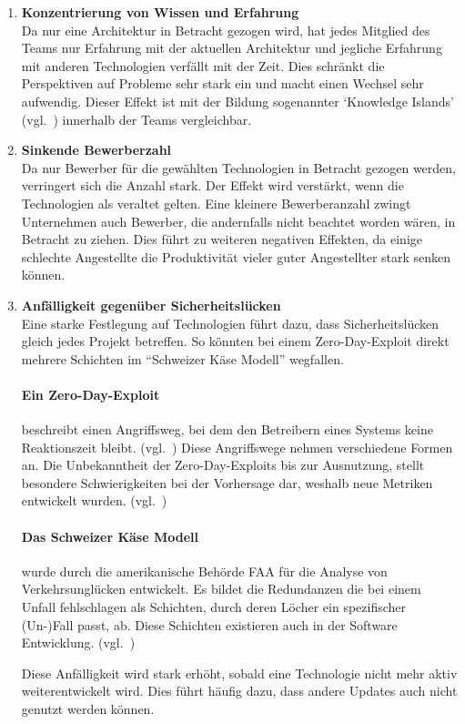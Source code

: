 \documentclass[./einleitung.tex]{subfiles}
\begin{document}
\begin{enumerate}
\item \textbf{Konzentrierung von Wissen und Erfahrung} \\
Da nur eine Architektur in Betracht gezogen wird, hat jedes Mitglied des Teams nur Erfahrung mit der aktuellen Architektur und jegliche Erfahrung mit anderen Technologien verfällt mit der Zeit.
Dies schränkt die Perspektiven auf Probleme sehr stark ein und macht einen Wechsel sehr aufwendig.
Dieser Effekt ist mit der Bildung sogenannter `Knowledge Islands' (vgl.~\cite{cury2024knowledge}) innerhalb der Teams vergleichbar.
\item \textbf{Sinkende Bewerberzahl} \\
Da nur Bewerber für die gewählten Technologien in Betracht gezogen werden, verringert sich die Anzahl stark.
Der Effekt wird verstärkt, wenn die Technologien als veraltet gelten.
Eine kleinere Bewerberanzahl zwingt Unternehmen auch Bewerber, die andernfalls nicht beachtet worden wären, in Betracht zu ziehen.
Dies führt zu weiteren negativen Effekten, da einige schlechte Angestellte die Produktivität vieler guter Angestellter stark senken können.
\item \textbf{Anfälligkeit gegenüber Sicherheitslücken} \\
Eine starke Festlegung auf Technologien führt dazu, dass Sicherheitslücken gleich jedes Projekt betreffen.
So könnten bei einem Zero-Day-Exploit direkt mehrere Schichten im ``Schweizer Käse Modell'' wegfallen.
\begin{center}
    \paragraph{Ein Zero-Day-Exploit} beschreibt einen Angriffsweg, bei dem den Betreibern eines Systems keine Reaktionszeit bleibt. (vgl.~\cite{ibmZeroDay})
    Diese Angriffswege nehmen verschiedene Formen an.
    Die Unbekanntheit der Zero-Day-Exploits bis zur Ausnutzung, stellt besondere Schwierigkeiten bei der Vorhersage dar, weshalb neue Metriken entwickelt wurden. (vgl.~\cite{wang2013k})
\end{center}
\begin{center}
    \paragraph{Das Schweizer Käse Modell} wurde durch die amerikanische Behörde FAA für die Analyse von Verkehrsunglücken entwickelt.
    Es bildet die Redundanzen die bei einem Unfall fehlschlagen als Schichten, durch deren Löcher ein spezifischer (Un-)Fall passt, ab.
    Diese Schichten existieren auch in der Software Entwicklung. (vgl.~\cite{bergeon2009swiss}) %
\end{center}
Diese Anfälligkeit wird stark erhöht, sobald eine Technologie nicht mehr aktiv weiterentwickelt wird.
Dies führt häufig dazu, dass andere Updates auch nicht genutzt werden können.
\end{enumerate}
\end{document}
